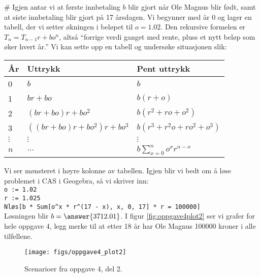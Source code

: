 \begin{easylist}[enumerate]
	# Igjen antar vi at første innbetaling $b$ blir gjort når Ole Magnus blir født, samt at siste innbetaling blir gjort på 17 årsdagen.
	Vi begynner med år 0 og lager en tabell, der vi setter økningen i beløpet til $o = 1.02$.
	Den rekursive formelen er $T_n = T_{n-1}r + bo^n$, altså ``forrige verdi ganget med rente, pluss et nytt beløp som øker hvert år.''
	Vi kan sette opp en tabell og undersøke situasjonen slik:
	\begin{center}
		\begin{tabular}{l|l|l}
			\textbf{År} & \textbf{Uttrykk} & \textbf{Pent uttrykk} \\ \hline
			0 & $b$ & $b$ \\
			1 & $br + bo$ & $b(r+o)$ \\
			2 & $\left(br + bo\right)r + bo^2$ & $b(r^2 + ro + o^2)$ \\
			3 & $\left( \left(br + bo\right)r + bo^2 \right)r + bo^3$ & $b(r^3 + r^2o + ro^2 + o^3)$ \\
			$\vdots$ & $\vdots$ & $\vdots$ \\
			$n$ & $\dots$ & $b \sum_{x = 0}^{n} o^x r^{n-x}$
		\end{tabular}
	\end{center}
	Vi ser mønsteret i høyre kolonne av tabellen.
	Igjen blir vi bedt om å løse problemet i CAS i Geogebra, så vi skriver inn: \\
	\texttt{o := 1.02} \\
	\texttt{r := 1.025} \\
	\texttt{Nløs[b * Sum[o\textasciicircum x * r\textasciicircum(17 - x), x, 0, 17] * r = 100000]} \\
	Løsningen blir $b = \answer{3712.01}$. I figur \eqref{fig:oppgave4plot2} ser vi grafer for hele oppgave 4, legg merke til at etter 18 år har Ole Magnus 100000 kroner i alle tilfellene. 
	\begin{figure}[th!]
		\centering
		\texttt{[image: figs/oppgave4\_plot2]}
		\caption{Scenarioer fra oppgave 4, del 2.}
		\label{fig:oppgave4plot2}
	\end{figure}
\end{easylist}







